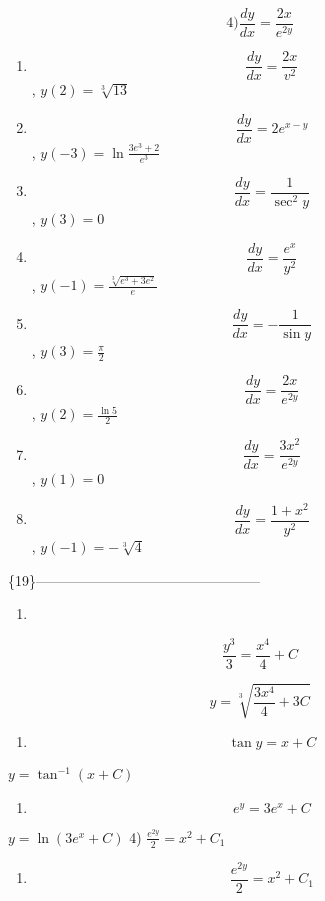 \documentclass[
]{article}
\providecommand{\tightlist}{%
  \setlength{\itemsep}{0pt}\setlength{\parskip}{0pt}}
\begin{document}
\[4) \frac{dy}{dx} = \frac{2x}{e^{2y}}\]

\begin{enumerate}
\def\labelenumi{\arabic{enumi})}
\setcounter{enumi}{4}
\item
  \[\frac{dy}{dx} = \frac{2x}{v^2}\] , \(y(2) = \sqrt[3]{13}\)
\item
  \[\frac{dy}{dx} = 2e^{x-y}\] , \(y(-3) = \ln \frac{3e^3 + 2}{e^3}\)
\item
  \[\frac{dy}{dx} = \frac{1}{\sec^2 y}\] , \(y(3) = 0\)
\item
  \[\frac{dy}{dx} = \frac{e^x}{y^2}\] ,
  \(y(-1) = \frac{\sqrt[3]{e^3 + 3e^2}}{e}\)
\item
  \[\frac{dy}{dx} = -\frac{1}{\sin y}\] , \(y(3) = \frac{\pi}{2}\)
\item
  \[\frac{dy}{dx} = \frac{2x}{e^{2y}}\] , \(y(2) = \frac{\ln 5}{2}\)
\item
  \[\frac{dy}{dx} = \frac{3x^2}{e^{2y}}\] , \(y(1) = 0\)
\item
  \[\frac{dy}{dx} = \frac{1+x^2}{y^2}\] , \(y(-1) = -\sqrt[3]{4}\)
\end{enumerate}

\{19\}------------------------------------------------

\begin{enumerate}
\def\labelenumi{\arabic{enumi})}
\tightlist
\item
\end{enumerate}

\[\frac{y^3}{3} = \frac{x^4}{4} + C\]

\[y = \sqrt[3]{\frac{3x^4}{4} + 3C}\]

\begin{enumerate}
\def\labelenumi{\arabic{enumi})}
\setcounter{enumi}{1}
\tightlist
\item
  \[\tan y = x + C\]
\end{enumerate}

\(y = \tan^{-1} (x + C)\)

\begin{enumerate}
\def\labelenumi{\arabic{enumi})}
\setcounter{enumi}{2}
\tightlist
\item
  \[e^y = 3e^x + C\]
\end{enumerate}

\(y = \ln (3e^x + C)\) 4) \(\frac{e^{2y}}{2} = x^2 + C_1\)

\begin{enumerate}
\def\labelenumi{\arabic{enumi})}
\setcounter{enumi}{3}
\tightlist
\item
  \[\frac{e^{2y}}{2} = x^2 + C_1\]
\end{enumerate}
\end{document}
